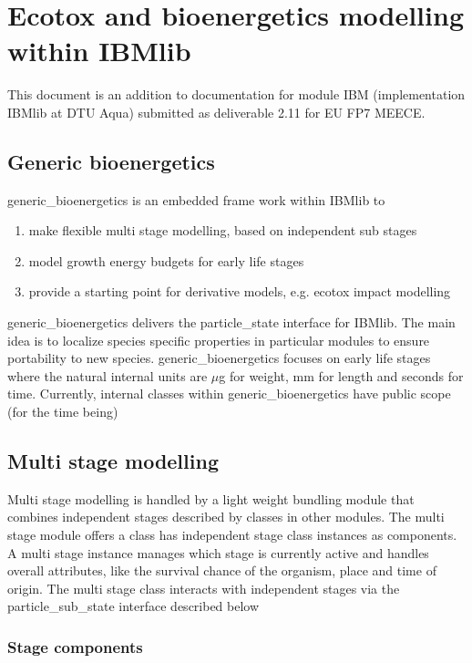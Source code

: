 

\section{Ecotox and bioenergetics modelling within IBMlib} 

This document is an addition to documentation for module IBM (implementation IBMlib at DTU Aqua)
submitted as deliverable 2.11 for EU FP7 MEECE. 

\subsection{Generic bioenergetics} 

generic\_bioenergetics is an embedded frame work within IBMlib to 
\begin{enumerate}
  \item make flexible multi stage modelling, based on independent sub stages
  \item model growth energy budgets for early life stages
  \item provide a starting point for derivative models, e.g. ecotox impact modelling
\end{enumerate} 
generic\_bioenergetics delivers the particle\_state interface for IBMlib.
The main idea is to localize species specific properties in particular modules
to ensure portability to new species.
generic\_bioenergetics focuses on early life stages where the natural internal units 
are $\mu$g for weight, mm for length and seconds for time.
Currently, internal classes within generic\_bioenergetics have public scope (for the time being)

\subsection{Multi stage modelling} 

Multi stage modelling is handled by a light weight bundling module that 
combines independent stages described by classes in other modules. The multi stage module
offers a class has independent stage class instances as components. A multi stage instance
manages which stage is currently active and handles overall attributes, like the survival chance
of the organism, place and time of origin. The multi stage class interacts with independent stages
via the particle\_sub\_state interface described below

\subsubsection{Stage components} 

